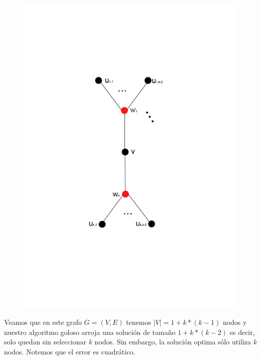 \begin{figure}[h]
\begin{center}
\includegraphics[scale=0.5]{imagenes/grafos-ej3-tp3-3.png}
\end{center}
\end{figure}

Veamos que en este grafo $G=(V,E)$ tenemos $|V| = 1 + k*(k-1)$ nodos y nuestro algoritmo goloso arroja una solución de tamaño $1 + k*(k-2)$ es decir, solo quedan sin seleccionar $k$ nodos. Sin embargo, la solución optima sólo utiliza $k$ nodos. Notemos que el error es cuadrático.


